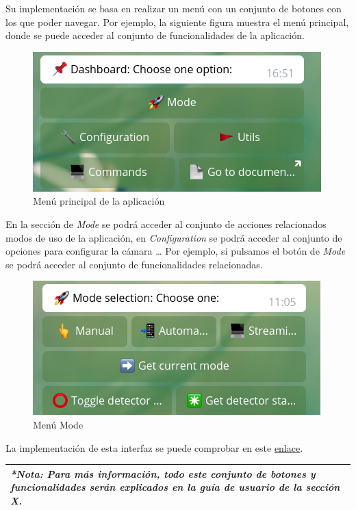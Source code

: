 \newpage

Su implementación se basa en realizar un menú con un conjunto de botones con los que poder navegar. Por ejemplo, la siguiente figura muestra el menú principal, donde se puede acceder al conjunto de funcionalidades de la aplicación.

\begin{figure}[h]
	\centering
	\includegraphics[scale=0.8]{images/42}
	\caption{Menú principal de la aplicación}
\end{figure}

En la sección de \textit{Mode} se podrá acceder al conjunto de acciones relacionados modos de uso de la aplicación, en \textit{Configuration} se podrá acceder al conjunto de opciones para configurar la cámara \ldots
Por ejemplo, si pulsamos el botón de \textit{Mode} se podrá acceder al conjunto de funcionalidades relacionadas.

\begin{figure}[h]
	\centering
	\includegraphics[scale=0.8]{images/39}
	\caption{Menú Mode}
\end{figure}

La implementación de esta interfaz se puede comprobar en este \href{https://github.com/jmv74211/TFM_security_system_PI/blob/master/src/agents/telegram_bot.py#L972}{enlace}.

\begin{tabular}{|p{15.5cm}|}
	
	\hline
	
	\textit{ \textbf{*Nota:} Para más información, todo este conjunto de botones y funcionalidades serán explicados en la guía de usuario de la sección X. }
	\\
	\hline
	
\end{tabular}

